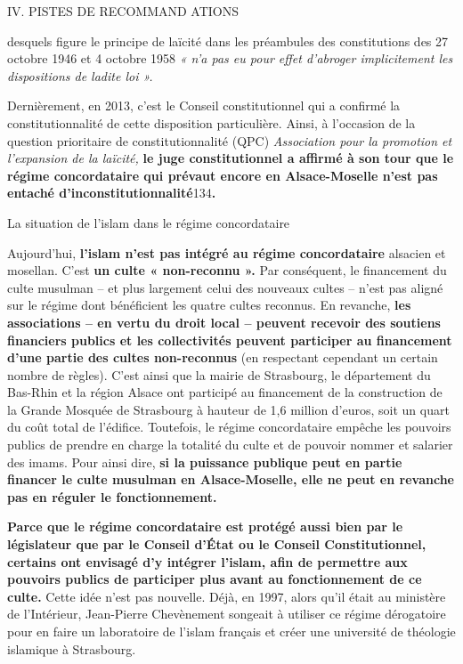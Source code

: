 IV. PISTES DE RECOMMAND ATIONS

desquels figure le principe de laïcité dans les préambules des
constitutions des 27 octobre 1946 et 4 octobre 1958 \emph{« n'a pas eu
pour effet d'abroger implicitement les dispositions de ladite loi ».}

Dernièrement, en 2013, c'est le Conseil constitutionnel qui a confirmé
la constitutionnalité de cette disposition particulière. Ainsi, à
l'occasion de la question prioritaire de constitutionnalité (QPC)
\emph{Association pour la promotion et l'expansion de la laïcité,}
\textbf{le juge constitutionnel a affirmé à son tour que le régime
concordataire qui prévaut encore en Alsace-Moselle n'est pas entaché
d'inconstitutionnalité}134\textbf{.}


La situation de l'islam dans le régime concordataire


Aujourd'hui, \textbf{l'islam n'est pas intégré au régime concordataire}
alsacien et mosellan. C'est \textbf{un culte « non-reconnu ».} Par
conséquent, le financement du culte musulman -- et plus largement celui
des nouveaux cultes -- n'est pas aligné sur le régime dont bénéficient
les quatre cultes reconnus. En revanche, \textbf{les associations -- en
vertu du droit local -- peuvent recevoir des soutiens financiers publics
et les collectivités peuvent participer au financement d'une partie des
cultes non-reconnus} (en respectant cependant un certain nombre de
règles). C'est ainsi que la mairie de Strasbourg, le département du
Bas-Rhin et la région Alsace ont participé au financement de la
construction de la Grande Mosquée de Strasbourg à hauteur de 1,6 million
d'euros, soit un quart du coût total de l'édifice. Toutefois, le régime
concordataire empêche les pouvoirs publics de prendre en charge la
totalité du culte et de pouvoir nommer et salarier des imams. Pour ainsi
dire, \textbf{si la puissance publique peut en partie financer le culte
musulman en Alsace-Moselle, elle ne peut en revanche pas en réguler le
fonctionnement.}

\textbf{Parce que le régime concordataire est protégé aussi bien par le
législateur que par le Conseil d'État ou le Conseil Constitutionnel,
certains ont envisagé d'y intégrer l'islam, afin de permettre aux
pouvoirs publics de participer plus avant au fonctionnement de ce
culte.} Cette idée n'est pas nouvelle. Déjà, en 1997, alors qu'il était
au ministère de l'Intérieur, Jean-Pierre Chevènement songeait à utiliser
ce régime dérogatoire pour en faire un laboratoire de l'islam français
et créer une université de théologie islamique à Strasbourg.

